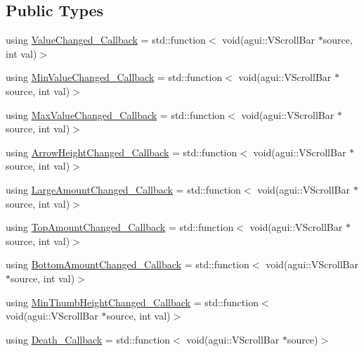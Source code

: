 \subsection*{Public Types}
\begin{DoxyCompactItemize}
\item 
using \mbox{\hyperlink{classec_1_1_generic_v_scroll_bar_listener_ae6332f8564b656388c34e02b9ee05575}{Value\+Changed\+\_\+\+Callback}} = std\+::function$<$ void(agui\+::\+V\+Scroll\+Bar $\ast$source, int val)$>$
\item 
using \mbox{\hyperlink{classec_1_1_generic_v_scroll_bar_listener_ad88274a7e9cf15ea8ff56b5cffed71b2}{Min\+Value\+Changed\+\_\+\+Callback}} = std\+::function$<$ void(agui\+::\+V\+Scroll\+Bar $\ast$source, int val)$>$
\item 
using \mbox{\hyperlink{classec_1_1_generic_v_scroll_bar_listener_a21e91025da3eebfc5da4b7489869183a}{Max\+Value\+Changed\+\_\+\+Callback}} = std\+::function$<$ void(agui\+::\+V\+Scroll\+Bar $\ast$source, int val)$>$
\item 
using \mbox{\hyperlink{classec_1_1_generic_v_scroll_bar_listener_ac1f858278a1e02d55a109fcf9939932c}{Arrow\+Height\+Changed\+\_\+\+Callback}} = std\+::function$<$ void(agui\+::\+V\+Scroll\+Bar $\ast$source, int val)$>$
\item 
using \mbox{\hyperlink{classec_1_1_generic_v_scroll_bar_listener_ad3ca6f0d2092abe22a26f20e821c35b6}{Large\+Amount\+Changed\+\_\+\+Callback}} = std\+::function$<$ void(agui\+::\+V\+Scroll\+Bar $\ast$source, int val)$>$
\item 
using \mbox{\hyperlink{classec_1_1_generic_v_scroll_bar_listener_af8bcd97ac937ea6fb151d93a419cd3a2}{Top\+Amount\+Changed\+\_\+\+Callback}} = std\+::function$<$ void(agui\+::\+V\+Scroll\+Bar $\ast$source, int val)$>$
\item 
using \mbox{\hyperlink{classec_1_1_generic_v_scroll_bar_listener_abcc4e00e4c23a24981d7fc0a7538d00f}{Bottom\+Amount\+Changed\+\_\+\+Callback}} = std\+::function$<$ void(agui\+::\+V\+Scroll\+Bar $\ast$source, int val)$>$
\item 
using \mbox{\hyperlink{classec_1_1_generic_v_scroll_bar_listener_a64ef9708903097baf5cc98348f8a02fa}{Min\+Thumb\+Height\+Changed\+\_\+\+Callback}} = std\+::function$<$ void(agui\+::\+V\+Scroll\+Bar $\ast$source, int val)$>$
\item 
using \mbox{\hyperlink{classec_1_1_generic_v_scroll_bar_listener_a821b55a49a6b6324b98a66872b19a823}{Death\+\_\+\+Callback}} = std\+::function$<$ void(agui\+::\+V\+Scroll\+Bar $\ast$source)$>$
\end{DoxyCompactItemize}

